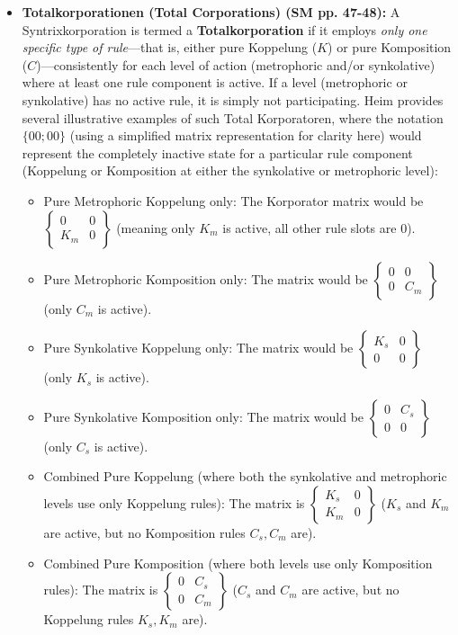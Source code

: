 \documentclass[12pt]{article}
\begin{document}
\begin{itemize}
    \item \textbf{Totalkorporationen (Total Corporations) (SM pp. 47-48):}
    A Syntrixkorporation is termed a \textbf{Totalkorporation} if it employs \textit{only one specific type of rule}—that is, either pure Koppelung (\( K \)) or pure Komposition (\( C \))—consistently for each level of action (metrophoric and/or synkolative) where at least one rule component is active. If a level (metrophoric or synkolative) has no active rule, it is simply not participating. Heim provides several illustrative examples of such Total Korporatoren, where the notation \( \{0 0; 0 0\} \) (using a simplified matrix representation for clarity here) would represent the completely inactive state for a particular rule component (Koppelung or Komposition at either the synkolative or metrophoric level):
    \begin{itemize}
        \item Pure Metrophoric Koppelung only: The Korporator matrix would be \( \begin{Bmatrix} 0 & 0 \\ K_m & 0 \end{Bmatrix} \) (meaning only \( K_m \) is active, all other rule slots are \(0\)).
        \item Pure Metrophoric Komposition only: The matrix would be \( \begin{Bmatrix} 0 & 0 \\ 0 & C_m \end{Bmatrix} \) (only \( C_m \) is active).
        \item Pure Synkolative Koppelung only: The matrix would be \( \begin{Bmatrix} K_s & 0 \\ 0 & 0 \end{Bmatrix} \) (only \( K_s \) is active).
        \item Pure Synkolative Komposition only: The matrix would be \( \begin{Bmatrix} 0 & C_s \\ 0 & 0 \end{Bmatrix} \) (only \( C_s \) is active).
        \item Combined Pure Koppelung (where both the synkolative and metrophoric levels use only Koppelung rules): The matrix is \( \begin{Bmatrix} K_s & 0 \\ K_m & 0 \end{Bmatrix} \) (\( K_s \) and \( K_m \) are active, but no Komposition rules \( C_s, C_m \) are).
        \item Combined Pure Komposition (where both levels use only Komposition rules): The matrix is \( \begin{Bmatrix} 0 & C_s \\ 0 & C_m \end{Bmatrix} \) (\( C_s \) and \( C_m \) are active, but no Koppelung rules \( K_s, K_m \) are).
    \end{itemize}


\end{itemize}
\end{document}
